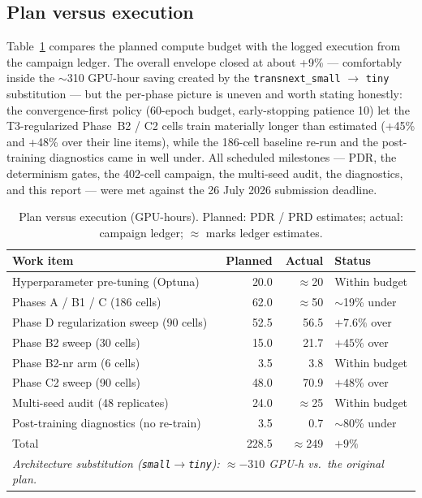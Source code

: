 \subsection{Plan versus execution}
Table~\ref{tab:plan_exec} compares the planned compute budget with the
logged execution from the campaign ledger. The overall envelope closed at
about +9\% --- comfortably inside the $\sim$310 GPU-hour saving created by
the \texttt{transnext\_small} $\rightarrow$ \texttt{tiny} substitution ---
but the per-phase picture is uneven and worth stating honestly: the
convergence-first policy (60-epoch budget, early-stopping patience 10) let
the T3-regularized Phase~B2 / C2 cells train materially longer than
estimated (+45\% and +48\% over their line items), while the 186-cell
baseline re-run and the post-training diagnostics came in well under. All
scheduled milestones --- PDR, the determinism gates, the 402-cell campaign,
the multi-seed audit, the diagnostics, and this report --- were met against
the 26 July 2026 submission deadline.

\begin{table}[htbp]
\centering
\caption{Plan versus execution (GPU-hours). Planned: PDR / PRD estimates; actual: campaign ledger; $\approx$ marks ledger estimates.}
\label{tab:plan_exec}
\setlength{\tabcolsep}{5pt}
\renewcommand{\arraystretch}{1.15}
\begin{tabular}{lrrl}
\toprule
Work item & Planned & Actual & Status \\
\midrule
Hyperparameter pre-tuning (Optuna)        & 20.0  & $\approx$20 & Within budget \\
Phases A / B1 / C (186 cells)             & 62.0  & $\approx$50 & $\sim$19\% under \\
Phase D regularization sweep (90 cells)   & 52.5  & 56.5        & $+7.6\%$ over \\
Phase B2 sweep (30 cells)                 & 15.0  & 21.7        & $+45\%$ over \\
Phase B2-nr arm (6 cells)                 & 3.5   & 3.8         & Within budget \\
Phase C2 sweep (90 cells)                 & 48.0  & 70.9        & $+48\%$ over \\
Multi-seed audit (48 replicates)          & 24.0  & $\approx$25 & Within budget \\
Post-training diagnostics (no re-train)   & 3.5   & 0.7         & $\sim$80\% under \\
\midrule
Total                                     & 228.5 & $\approx$249 & $+9\%$ \\
\midrule
\multicolumn{4}{l}{\emph{Architecture substitution (\texttt{small}$\rightarrow$\texttt{tiny}): $\approx -310$ GPU-h vs.\ the original plan.}} \\
\bottomrule
\end{tabular}
\end{table}

